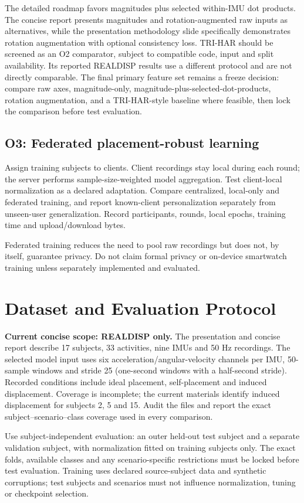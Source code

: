 \documentclass[10pt,a4paper]{article}
\begin{document}
The detailed roadmap favors magnitudes plus selected within-IMU dot products. The concise report presents magnitudes and rotation-augmented raw inputs as alternatives, while the presentation methodology slide specifically demonstrates rotation augmentation with optional consistency loss. TRI-HAR should be screened as an O2 comparator, subject to compatible code, input and split availability. Its reported REALDISP results use a different protocol and are not directly comparable. The final primary feature set remains a freeze decision: compare raw axes, magnitude-only, magnitude-plus-selected-dot-products, rotation augmentation, and a TRI-HAR-style baseline where feasible, then lock the comparison before test evaluation.

\subsection{O3: Federated placement-robust learning}
Assign training subjects to clients. Client recordings stay local during each round; the server performs sample-size-weighted model aggregation. Test client-local normalization as a declared adaptation. Compare centralized, local-only and federated training, and report known-client personalization separately from unseen-user generalization. Record participants, rounds, local epochs, training time and upload/download bytes.

Federated training reduces the need to pool raw recordings but does not, by itself, guarantee privacy. Do not claim formal privacy or on-device smartwatch training unless separately implemented and evaluated.

\section{Dataset and Evaluation Protocol}
\textbf{Current concise scope: REALDISP only.} The presentation and concise report describe 17 subjects, 33 activities, nine IMUs and 50 Hz recordings. The selected model input uses six acceleration/angular-velocity channels per IMU, 50-sample windows and stride 25 (one-second windows with a half-second stride). Recorded conditions include ideal placement, self-placement and induced displacement. Coverage is incomplete; the current materials identify induced displacement for subjects 2, 5 and 15. Audit the files and report the exact subject--scenario--class coverage used in every comparison.

Use subject-independent evaluation: an outer held-out test subject and a separate validation subject, with normalization fitted on training subjects only. The exact folds, available classes and any scenario-specific restrictions must be locked before test evaluation. Training uses declared source-subject data and synthetic corruptions; test subjects and scenarios must not influence normalization, tuning or checkpoint selection.
\end{document}
